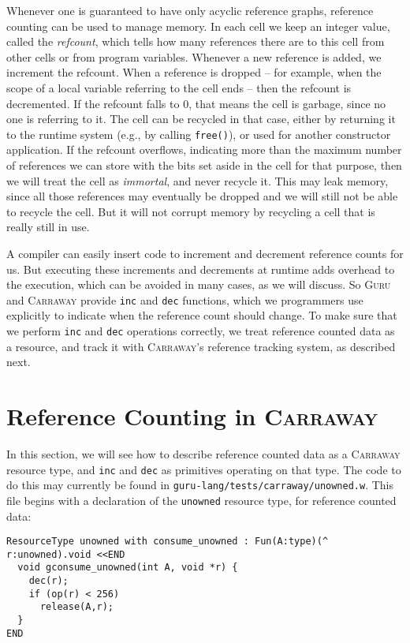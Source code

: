 \documentclass{book}[12pt]
\newcommand{\guru}[0]{\textsc{Guru}\xspace}
\newcommand{\carraway}[0]{\textsc{Carraway}\xspace}
\begin{document}
Whenever one is guaranteed to have only acyclic reference graphs,
reference counting can be used to manage memory.  In each cell we keep
an integer value, called the \emph{refcount}, which tells how many
references there are to this cell from other cells or from program
variables.  Whenever a new reference is added, we increment the
refcount.  When a reference is dropped -- for example, when the scope
of a local variable referring to the cell ends -- then the refcount is
decremented.  If the refcount falls to $0$, that means the cell is
garbage, since no one is referring to it.  The cell can be recycled in
that case, either by returning it to the runtime system (e.g., by
calling \texttt{free()}), or used for another constructor application.
If the refcount overflows, indicating more than the maximum number of
references we can store with the bits set aside in the cell for that
purpose, then we will treat the cell as \emph{immortal}, and never
recycle it.  This may leak memory, since all those references may
eventually be dropped and we will still not be able to recycle the
cell.  But it will not corrupt memory by recycling a cell that is
really still in use.

A compiler can easily insert code to increment and decrement reference
counts for us.  But executing these increments and decrements at
runtime adds overhead to the execution, which can be avoided in many
cases, as we will discuss.  So \guru and \carraway provide
\texttt{inc} and \texttt{dec} functions, which we programmers use
explicitly to indicate when the reference count should change.  To
make sure that we perform \texttt{inc} and \texttt{dec} operations
correctly, we treat reference counted data as a resource, and track it
with \carraway's reference tracking system, as described next.

\section{Reference Counting in \carraway}

In this section, we will see how to describe reference counted data as
a \carraway resource type, and \texttt{inc} and \texttt{dec} as
primitives operating on that type.  The code to do this may currently
be found in \texttt{guru-lang/tests/carraway/unowned.w}.  This file
begins with a declaration of the \texttt{unowned} resource type, for
reference counted data:

\begin{verbatim}
ResourceType unowned with consume_unowned : Fun(A:type)(^ r:unowned).void <<END
  void gconsume_unowned(int A, void *r) {
    dec(r);
    if (op(r) < 256)
      release(A,r);
  }
END
\end{verbatim}
\end{document}
